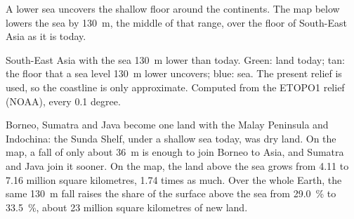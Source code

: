 A lower sea uncovers the shallow floor around the continents. The map below
lowers the sea by \qty{130}{m}, the middle of that range, over the floor of
South-East Asia as it is today.

\begin{omfigure}

{\small South-East Asia with the sea \qty{130}{m} lower than today. Green:
land today; tan: the floor that a sea level \qty{130}{m} lower uncovers; blue:
sea. The present relief is used, so the coastline is only approximate.
Computed from the ETOPO1 relief (NOAA), every 0.1 degree.}
\end{omfigure}

Borneo, Sumatra and Java become one land with the Malay Peninsula and
Indochina: the Sunda Shelf, under a shallow sea today, was dry land. On the map, a
fall of only about \qty{36}{m} is enough to join Borneo to Asia, and Sumatra and
Java join it sooner. On the map,
the land above the sea grows from 4.11 to 7.16 million square kilometres,
1.74 times as much. Over the whole Earth, the same \qty{130}{m} fall raises
the share of the surface above the sea from \qty{29.0}{\percent} to
\qty{33.5}{\percent}, about 23 million square kilometres of new land.

